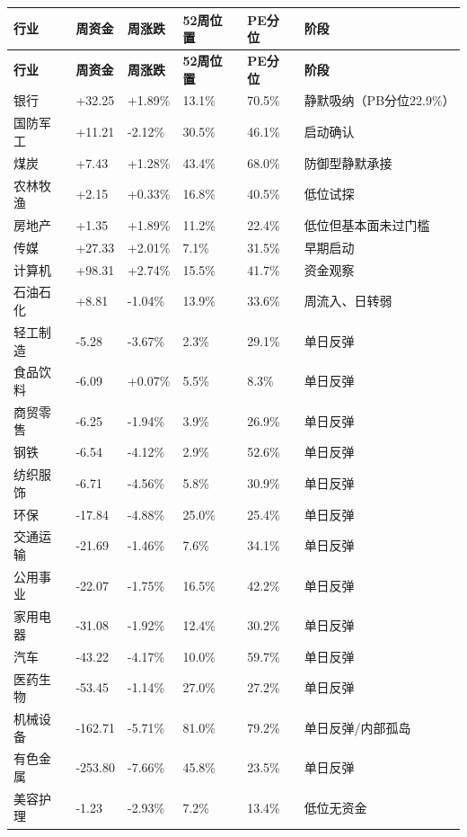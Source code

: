 \small
\begin{longtable}{L{2.2cm}R{1.45cm}R{1.45cm}R{1.35cm}R{1.35cm}L{3.1cm}}
\toprule
\textbf{行业} & \textbf{周资金} & \textbf{周涨跌} & \textbf{52周位置} & \textbf{PE分位} & \textbf{阶段} \\
\midrule
\endfirsthead
\toprule
\textbf{行业} & \textbf{周资金} & \textbf{周涨跌} & \textbf{52周位置} & \textbf{PE分位} & \textbf{阶段} \\
\midrule
\endhead
银行 & +32.25 & +1.89\% & 13.1\% & 70.5\% & 静默吸纳（PB分位22.9\%） \\
国防军工 & +11.21 & -2.12\% & 30.5\% & 46.1\% & 启动确认 \\
煤炭 & +7.43 & +1.28\% & 43.4\% & 68.0\% & 防御型静默承接 \\
农林牧渔 & +2.15 & +0.33\% & 16.8\% & 40.5\% & 低位试探 \\
房地产 & +1.35 & +1.89\% & 11.2\% & 22.4\% & 低位但基本面未过门槛 \\
传媒 & +27.33 & +2.01\% & 7.1\% & 31.5\% & 早期启动 \\
计算机 & +98.31 & +2.74\% & 15.5\% & 41.7\% & 资金观察 \\
石油石化 & +8.81 & -1.04\% & 13.9\% & 33.6\% & 周流入、日转弱 \\
轻工制造 & -5.28 & -3.67\% & 2.3\% & 29.1\% & 单日反弹 \\
食品饮料 & -6.09 & +0.07\% & 5.5\% & 8.3\% & 单日反弹 \\
商贸零售 & -6.25 & -1.94\% & 3.9\% & 26.9\% & 单日反弹 \\
钢铁 & -6.54 & -4.12\% & 2.9\% & 52.6\% & 单日反弹 \\
纺织服饰 & -6.71 & -4.56\% & 5.8\% & 30.9\% & 单日反弹 \\
环保 & -17.84 & -4.88\% & 25.0\% & 25.4\% & 单日反弹 \\
交通运输 & -21.69 & -1.46\% & 7.6\% & 34.1\% & 单日反弹 \\
公用事业 & -22.07 & -1.75\% & 16.5\% & 42.2\% & 单日反弹 \\
家用电器 & -31.08 & -1.92\% & 12.4\% & 30.2\% & 单日反弹 \\
汽车 & -43.22 & -4.17\% & 10.0\% & 59.7\% & 单日反弹 \\
医药生物 & -53.45 & -1.14\% & 27.0\% & 27.2\% & 单日反弹 \\
机械设备 & -162.71 & -5.71\% & 81.0\% & 79.2\% & 单日反弹/内部孤岛 \\
有色金属 & -253.80 & -7.66\% & 45.8\% & 23.5\% & 单日反弹 \\
美容护理 & -1.23 & -2.93\% & 7.2\% & 13.4\% & 低位无资金 \\

\end{longtable}
